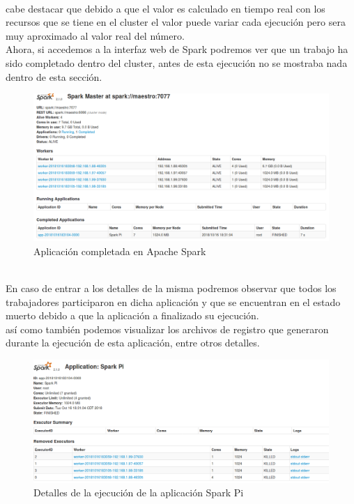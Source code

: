 \\ cabe destacar que debido a que el valor es calculado en tiempo real con los recursos que se tiene en el cluster el valor puede variar cada ejecución pero sera muy aproximado al valor real del número.
\\
Ahora, si accedemos a la interfaz web de Spark podremos ver que un trabajo ha sido completado dentro del cluster, antes de esta ejecución no se mostraba nada dentro de esta sección. \\
\begin{figure}[!htbp]
	\hypertarget{fig:red6}{\hspace{1pt}}
	\begin{center}
		\includegraphics[width=.7\textwidth]{capitulo3/images/im6.png}
		\caption{Aplicación completada en Apache Spark}
		\label{fig:red6}
	\end{center}
\end{figure}
\\ En caso de entrar a los detalles de la misma podremos observar que todos los trabajadores participaron en dicha aplicación y que se encuentran en el estado muerto debido a que la aplicación a finalizado su ejecución. 
\\ así como también podemos visualizar los archivos de registro que generaron durante la ejecución de esta aplicación, entre otros detalles.
\begin{figure}[!htbp]
	\hypertarget{fig:red7}{\hspace{1pt}}
	\begin{center}
		\includegraphics[width=.7\textwidth]{capitulo3/images/im10.png}
		\caption{Detalles de la ejecución de la aplicación Spark Pi}
		\label{fig:red7}
	\end{center}
\end{figure}
